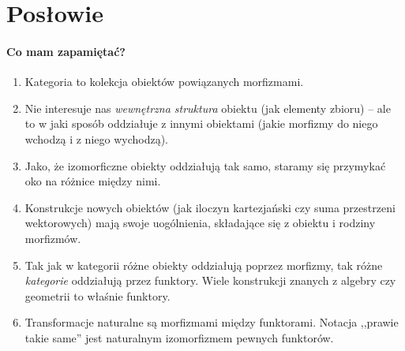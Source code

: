 \section{Posłowie}
\paragraph{Co mam zapamiętać?}
\begin{enumerate}
  \item Kategoria to kolekcja obiektów powiązanych morfizmami.
  \item Nie interesuje nas \emph{wewnętrzna struktura} obiektu (jak elementy zbioru) -- ale to w jaki sposób oddziałuje z innymi obiektami (jakie morfizmy do niego wchodzą i z niego wychodzą).
  \item Jako, że izomorficzne obiekty oddziałują tak samo, staramy się przymykać oko na różnice między nimi.
  \item Konstrukcje nowych obiektów (jak iloczyn kartezjański czy suma przestrzeni wektorowych) mają swoje uogólnienia, składające się z obiektu i rodziny morfizmów.
  \item Tak jak w kategorii różne obiekty oddziałują poprzez morfizmy, tak różne \emph{kategorie} oddziałują przez funktory. Wiele konstrukcji znanych z algebry czy geometrii to właśnie funktory.
  \item Transformacje naturalne są morfizmami między funktorami. Notacja ,,prawie takie same'' jest naturalnym izomorfizmem pewnych funktorów.
\end{enumerate}

